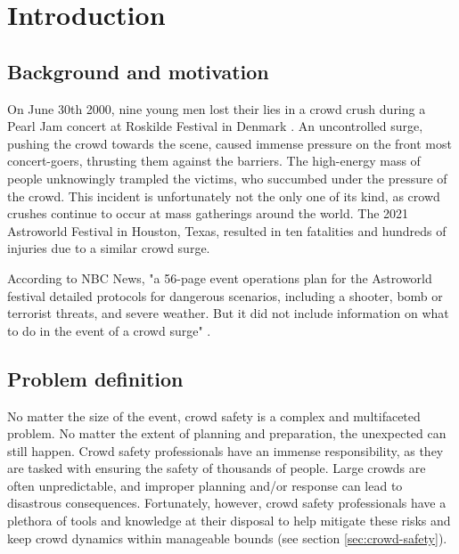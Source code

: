 \chapter{Introduction}

\section{Background and motivation}
\label{sec:background}
On June 30th 2000, nine young men lost their lies in a crowd crush during a Pearl Jam concert at Roskilde Festival in Denmark \cite{pearl_jam}. An uncontrolled surge, pushing the crowd towards the scene, caused immense pressure on the front most concert-goers, thrusting them against the barriers. The high-energy mass of people unknowingly trampled the victims, who succumbed under the pressure of the crowd. This incident is unfortunately not the only one of its kind, as crowd crushes continue to occur at mass gatherings around the world. The 2021 Astroworld Festival in Houston, Texas, resulted in ten fatalities and hundreds of injuries due to a similar crowd surge.




According to NBC News, "a 56-page event operations plan for the Astroworld festival detailed protocols for dangerous scenarios, including a shooter, bomb or terrorist threats, and severe weather. But it did not include information on what to do in the event of a crowd surge" \cite{astroworld}.



\section{Problem definition}
\label{sec:problem-definition}

No matter the size of the event, crowd safety is a complex and multifaceted problem. No matter the extent of planning and preparation, the unexpected can still happen. Crowd safety professionals have an immense responsibility, as they are tasked with ensuring the safety of thousands of people. Large crowds are often unpredictable, and improper planning and/or response can lead to disastrous consequences. Fortunately, however, crowd safety professionals have a plethora of tools and knowledge at their disposal to help mitigate these risks and keep crowd dynamics within manageable bounds (see section \ref{sec:crowd-safety}).

